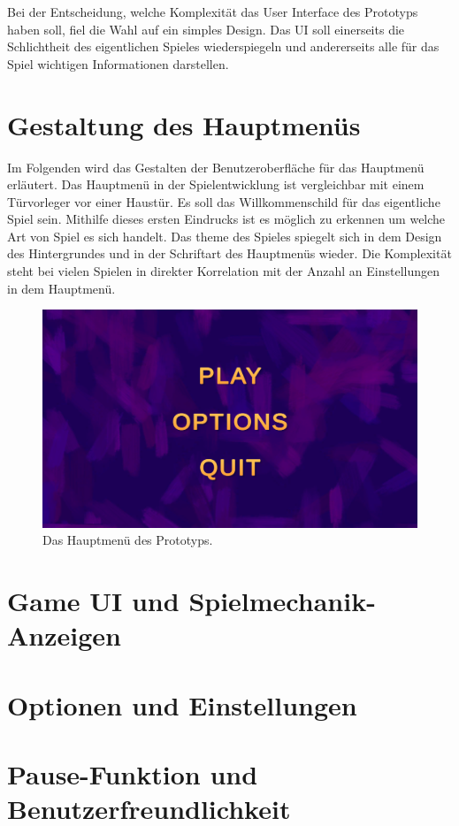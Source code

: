 \noindent
Bei der Entscheidung, welche Komplexität das User Interface des Prototyps haben soll, fiel die Wahl auf ein simples Design. 
Das \gls{UI} soll einerseits die Schlichtheit des eigentlichen Spieles wiederspiegeln und andererseits alle für das Spiel wichtigen Informationen darstellen.

\section{Gestaltung des Hauptmenüs}

Im Folgenden wird das Gestalten der Benutzeroberfläche für das Hauptmenü erläutert. 
Das Hauptmenü in der Spielentwicklung ist vergleichbar mit einem Türvorleger vor einer Haustür. Es soll das Willkommenschild für das eigentliche Spiel sein. 
Mithilfe dieses ersten Eindrucks ist es möglich zu erkennen um welche Art von Spiel es sich handelt. Das \gls{theme} des Spieles spiegelt sich in dem Design des Hintergrundes und in der Schriftart des Hauptmenüs wieder. Die Komplexität steht bei vielen Spielen in direkter Korrelation mit der Anzahl an Einstellungen in dem Hauptmenü.


\begin{figure}[H]
    \centering
    \includegraphics[width=1\textwidth]{chapters/03/images/MainMenu.png}
    \caption{Das Hauptmenü des Prototyps.}
    \label{htl02}
\end{figure}

\section{Game UI und Spielmechanik-Anzeigen}
\section{Optionen und Einstellungen}
\section{Pause-Funktion und Benutzerfreundlichkeit}